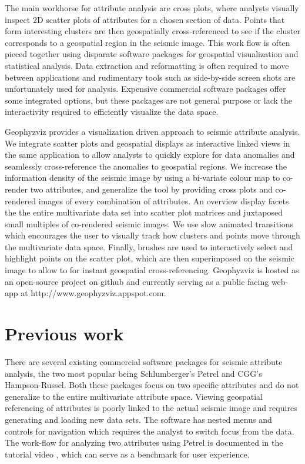 \documentclass[journal]{vgtc}                %
\begin{document}
The main workhorse for attribute analysis are cross plots, where analysts visually inspect
2D scatter plots of attributes for a chosen section of data. Points that form interesting clusters
are then geospatially cross-referenced to see if the cluster corresponds to a geospatial region in the seismic image.
This work flow is often pieced together using disparate software packages for geospatial visualization
and statistical analysis. Data extraction and reformatting is often required to move between applications
and rudimentary tools such as side-by-side screen shots are unfortunately used for analysis.
Expensive commercial software packages offer some integrated options, but these packages are not general
purpose or lack the interactivity required to efficiently visualize the data space.

Geophyzviz provides a visualization driven approach to seismic attribute analysis. We integrate
scatter plots and geospatial displays as interactive linked views in the same application to allow
analysts to quickly explore for data anomalies and seamlessly cross-reference the anomalies to geospatial
regions. We increase the information density of the seismic image by using a bi-variate colour map to
co-render two attributes, and generalize the tool by providing cross plots and co-rendered images of
every combination of attributes. An overview display facets the the entire multivariate data set into
scatter plot matrices and juxtaposed small multiples of co-rendered seismic images. We use slow animated
transitions which encourages the user to visually track how clusters and points move through
the multivariate data space. Finally, brushes are used to interactively select and highlight
points on the scatter plot, which are then superimposed on the seismic image to allow to for
instant geospatial cross-referencing. Geophyzviz is hosted as an open-source project on github
and currently serving as a public facing web-app at http://www.geophyzviz.appspot.com.



\section{Previous work}


There are several existing commercial software packages for seismic attribute analysis, the
two most popular being Schlumberger's Petrel and CGG's Hampson-Russel. Both these packages
focus on two specific attributes and do not generalize to the entire multivariate attribute space.
Viewing geospatial referencing of attributes is poorly linked to the actual seismic image and requires
generating and loading new data sets. The software has nested menus and controls for navigation
which requires the analyst to switch focus from the data. The work-flow for analyzing two attributes
using Petrel is documented in the tutorial video \cite{petrel-vid}, which can serve as a benchmark for user experience.
\end{document}

